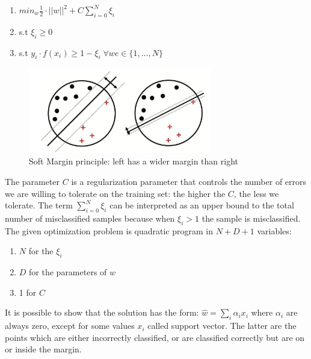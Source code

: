 \documentclass[LaM,binding=0.6cm]{sapthesis}
\begin{document}
\begin{enumerate}
\item $min_{w} \frac{1}{2}\cdot||w||^2 +C\sum_{i=0}^{N}\xi_i$ 
\item s.t $\xi_i\geq0$
\item s.t $y_i\cdot f(x_i)\geq1-\xi_i \; \forall we \in \{1,\dots,N\}$
\end{enumerate}
\begin{figure}   \centering
    \includegraphics[width=80mm,scale=0.7]{largevssoft}
    \caption{Soft Margin principle: left has a wider margin than right \cite{bishop}}
    \label{fig:largevssoft}
\end{figure}
The parameter $C$ is a regularization parameter that controls the number of errors we are willing to tolerate on the training set: the higher the $C$, the less we tolerate. The term $\sum_{i=0}^{N}\xi_i$ can be interpreted as an upper bound to the total number of misclassified samples because when $\xi_i>1$ the sample is misclassified. The given optimization problem is quadratic program in $N + D + 1$ variables: 
\begin{enumerate}
\item $N$ for the $\xi_i$
\item $D$ for the parameters of $w$
\item 1 for $C$
\end{enumerate}
It is possible to show that the solution has the form: $\hat{w}=\sum_i\alpha_ix_i$ where $\alpha_i$ are always zero, except for some values $x_i$ called support vector. The latter are the points which are either incorrectly classified, or are classified correctly but are on or inside the margin.
\end{document}
